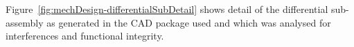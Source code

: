       \\\\
        Figure~\ref{fig:mechDesign-differentialSubDetail} shows detail of the differential sub-assembly as generated in the CAD package used and which was analysed for interferences and functional integrity.
        
        \begin{figure}[h!]
        \centering
        \qquad
        \subfloat[\label{fig:mechDesign-differentialSubDetail-b}]{
}
\end{figure}
